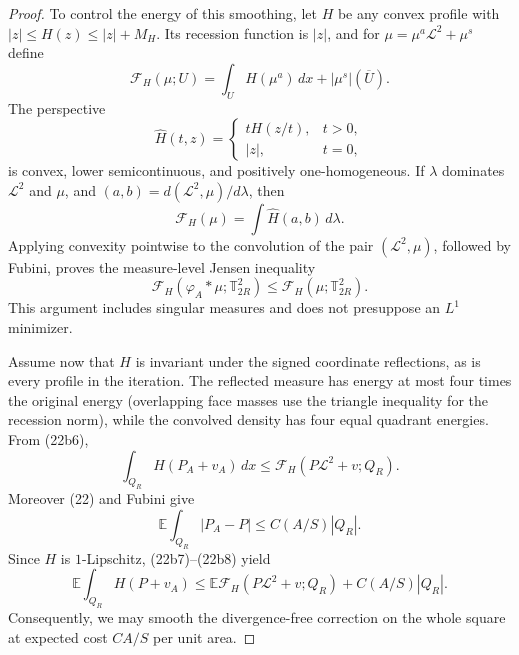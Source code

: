\documentclass{aomart}
\theoremstyle{definition}
\newcommand{\1}{\mathbf 1}
\begin{document}
\begin{proof}
To control the energy of this smoothing, let $H$ be any convex profile with
$|z|\leq H(z)\leq|z|+M_ H$.  Its recession function is $|z|$, and
for $\mu=\mu^a\mathcal L^2+\mu^s$ define
\begin{equation*}
\mathcal F_ H(\mu;U)=\int_ UH(\mu^a)\,dx+|\mu^s|(\overline U).
\end{equation*}
The perspective
\begin{equation*}
\widehat H(t,z)=
\begin{cases}tH(z/t),&t>0,\\ |z|,&t=0,
\end{cases}
\end{equation*}
is convex, lower semicontinuous, and positively one-homogeneous.  If
$\lambda$ dominates $\mathcal L^2$ and $\mu$, and
$(a,b)=d(\mathcal L^2,\mu)/d\lambda$, then
\begin{equation}
\mathcal F_ H(\mu)=\int\widehat H(a,b)\,d\lambda.
\tag{22b5}
\end{equation}
Applying convexity pointwise to the convolution of the pair
$(\mathcal L^2,\mu)$, followed by Fubini, proves the measure-level
Jensen inequality
\begin{equation}
\mathcal F_ H(\varphi_ A*\mu;\mathbb T_ {2R}^2)
\leq\mathcal F_ H(\mu;\mathbb T_ {2R}^2).
\tag{22b6}
\end{equation}
This argument includes singular measures and does not presuppose an
$L^1$ minimizer.

Assume now that $H$ is invariant under the signed coordinate
reflections, as is every profile in the iteration.  The reflected
measure has energy at most four times the original energy (overlapping
face masses use the triangle inequality for the recession norm), while
the convolved density has four equal quadrant energies.  From (22b6),
\begin{equation}
\int_ {Q_ R}H(P_ A+v_ A)\,dx
\leq\mathcal F_ H(P\mathcal L^2+v;Q_ R).
\tag{22b7}
\end{equation}
Moreover (22) and Fubini give
\begin{equation}
\mathbb E\int_ {Q_ R}|P_ A-P|\leq C(A/S)|Q_ R|.
\tag{22b8}
\end{equation}
Since $H$ is $1$-Lipschitz, (22b7)--(22b8) yield
\begin{equation}
\mathbb E\int_ {Q_ R}H(P+v_ A)
\leq\mathbb E\mathcal F_ H(P\mathcal L^2+v;Q_ R)
+C(A/S)|Q_ R|.
\tag{22b9}
\end{equation}
Consequently, we may smooth the divergence-free correction on the
whole square at expected cost $CA/S$ per unit area.


\end{proof}
\end{document}
